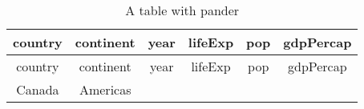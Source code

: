 \documentclass[]{article}
\begin{document}
\begin{longtable}[]{@{}cccccc@{}}
\caption{A table with pander}\tabularnewline
\toprule
\begin{minipage}[b]{0.12\columnwidth}\centering
country\strut
\end{minipage} & \begin{minipage}[b]{0.14\columnwidth}\centering
continent\strut
\end{minipage} & \begin{minipage}[b]{0.08\columnwidth}\centering
year\strut
\end{minipage} & \begin{minipage}[b]{0.12\columnwidth}\centering
lifeExp\strut
\end{minipage} & \begin{minipage}[b]{0.13\columnwidth}\centering
pop\strut
\end{minipage} & \begin{minipage}[b]{0.14\columnwidth}\centering
gdpPercap\strut
\end{minipage}\tabularnewline
\midrule
\endfirsthead
\toprule
\begin{minipage}[b]{0.12\columnwidth}\centering
country\strut
\end{minipage} & \begin{minipage}[b]{0.14\columnwidth}\centering
continent\strut
\end{minipage} & \begin{minipage}[b]{0.08\columnwidth}\centering
year\strut
\end{minipage} & \begin{minipage}[b]{0.12\columnwidth}\centering
lifeExp\strut
\end{minipage} & \begin{minipage}[b]{0.13\columnwidth}\centering
pop\strut
\end{minipage} & \begin{minipage}[b]{0.14\columnwidth}\centering
gdpPercap\strut
\end{minipage}\tabularnewline
\midrule
\endhead
\begin{minipage}[t]{0.12\columnwidth}\centering
Canada\strut
\end{minipage} & \begin{minipage}[t]{0.14\columnwidth}\centering
Americas\strut
\end{minipage} & \begin{minipage}[t]{0.08\columnwidth}\centering
1952\strut
\end{minipage} & \begin{minipage}[t]{0.12\columnwidth}\centering

\end{minipage}
\end{longtable}
\end{document}
